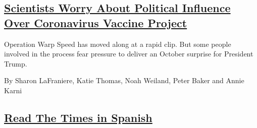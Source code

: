\begin{enumerate}
  \hypertarget{scientists-worry-about-political-influence-over-coronavirus-vaccine-project}{%
  \subsection{\texorpdfstring{\href{/2020/08/02/us/politics/coronavirus-vaccine.html}{Scientists
  Worry About Political Influence Over Coronavirus Vaccine
  Project}}{Scientists Worry About Political Influence Over Coronavirus Vaccine Project}}\label{scientists-worry-about-political-influence-over-coronavirus-vaccine-project}}

  Operation Warp Speed has moved along at a rapid clip. But some people
  involved in the process fear pressure to deliver an October surprise
  for President Trump.

  By Sharon LaFraniere, Katie Thomas, Noah Weiland, Peter Baker and
  Annie Karni
\end{enumerate}

\hypertarget{read-the-times-in-spanish}{%
\subsection{\texorpdfstring{\protect\hyperlink{}{Read The Times in
Spanish}}{Read The Times in Spanish}}\label{read-the-times-in-spanish}}

